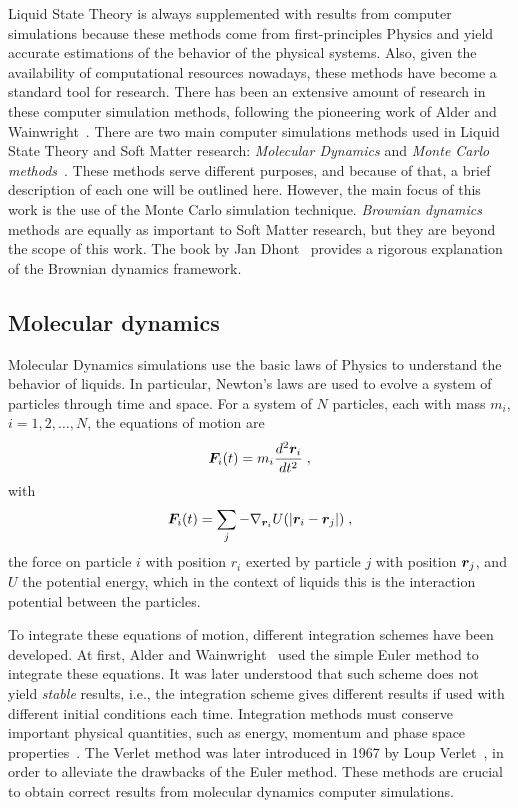 Liquid State Theory is always supplemented with results from computer simulations
because these methods come from first-principles Physics and yield accurate estimations
of the behavior of the physical systems. Also, given the availability of computational
resources nowadays, these methods have become a standard tool for research.
There has been an extensive amount of research in these computer simulation methods,
following the pioneering work of Alder and Wainwright~\cite{alderPhaseTransitionHard1957a}.
There are two main computer simulations methods used in Liquid State Theory and
Soft Matter research: \emph{Molecular Dynamics} and \emph{Monte Carlo methods}~\cite{allenComputerSimulationLiquids2017,frenkelUnderstandingMolecularSimulation2001}.
These methods serve different purposes, and because of that, a brief description of each
one will be outlined here. However, the main focus of this work is the use of
the Monte Carlo simulation technique. \emph{Brownian dynamics} methods are
equally as important to Soft Matter research, but they are beyond the scope of this work.
The book by Jan Dhont~\cite{dhontIntroductionDynamicsColloids1996} provides a rigorous
explanation of the Brownian dynamics framework.

\subsection{Molecular dynamics}
Molecular Dynamics simulations use the basic laws of Physics to understand the behavior
of liquids. In particular, Newton's laws are used to evolve a system of particles through
time and space. For a system of $N$ particles, each with mass $m_i$, $i=1,2,\dots,N$,
the equations of motion are
\begin{equation}
    \bm{F}_i (t) = m_i \frac{d^2 \bm{r}_i}{dt^2} \; ,
    \label{eq:newton}
\end{equation}
with
\begin{equation}
    \bm{F}_i (t) = \sum_{j} - \nabla_{\bm{r}_i} U(\lvert \bm{r}_i - \bm{r}_j \rvert)
    \; ,
    \label{eq:newton-potential}
\end{equation}
the force on particle $i$ with position $r_i$ exerted by particle $j$ with position
$\bm{r}_j$, and $U$ the potential energy, which in the context of liquids this is the
interaction potential between the particles.

To integrate these equations of motion, different integration schemes have been developed.
At first, Alder and Wainwright~\cite{alderPhaseTransitionHard1957a} used the simple
Euler method to integrate these equations. It was later understood that such scheme
does not yield \emph{stable} results, i.e., the integration scheme gives different results
if used with different initial conditions each time.
Integration methods must conserve important physical quantities, such as energy,
momentum and phase space properties~\cite{razafindralandyReviewGeometricIntegrators2018}.
The Verlet method was later introduced in 1967 by Loup Verlet~\cite{verletComputerExperimentsClassical1967a},
in order to alleviate the drawbacks of the Euler method. These methods are crucial to obtain
correct results from molecular dynamics computer simulations.

